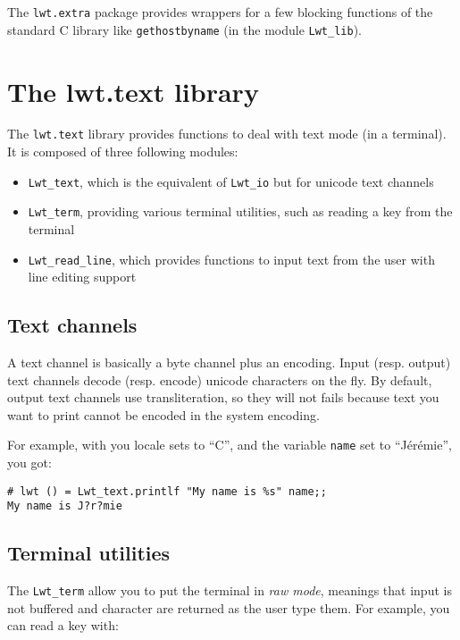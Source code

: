 \documentclass{article}
\begin{document}
The \texttt{lwt.extra} package provides wrappers for a few blocking
functions of the standard C library like \texttt{gethostbyname} (in
the module \texttt{Lwt\_lib}).

\section{The lwt.text library}

The \texttt{lwt.text} library provides functions to deal with text
mode (in a terminal). It is composed of three following modules:

\begin{itemize}
\item \texttt{Lwt\_text}, which is the equivalent of \texttt{Lwt\_io}
  but for unicode text channels
\item \texttt{Lwt\_term}, providing various terminal utilities, such as
  reading a key from the terminal
\item \texttt{Lwt\_read\_line}, which provides functions to input text
  from the user with line editing support
\end{itemize}

\subsection{Text channels}

A text channel is basically a byte channel plus an encoding. Input
(resp. output) text channels decode (resp. encode) unicode characters
on the fly. By default, output text channels use transliteration, so
they will not fails because text you want to print cannot be encoded
in the system encoding.

For example, with you locale sets to ``C'', and the variable
\texttt{name} set to ``Jérémie'', you got:

\begin{verbatim}
# lwt () = Lwt_text.printlf "My name is %s" name;;
My name is J?r?mie
\end{verbatim}

\subsection{Terminal utilities}

The \texttt{Lwt\_term} allow you to put the terminal in \emph{raw
  mode}, meanings that input is not buffered and character are
returned as the user type them. For example, you can read a key with:
\end{document}
